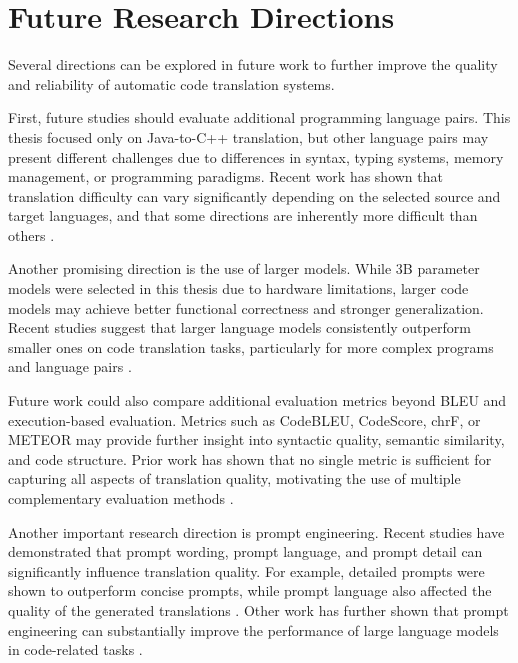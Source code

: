 \chapter{Future Research Directions}



Several directions can be explored in future work to further improve the quality
and reliability of automatic code translation systems.

First, future studies should evaluate additional programming language pairs.
This thesis focused only on Java-to-C++ translation, but other language pairs
may present different challenges due to differences in syntax, typing systems,
memory management, or programming paradigms. Recent work has shown that
translation difficulty can vary significantly depending on the selected source
and target languages, and that some directions are inherently more difficult
than others \cite{aljagthami2025prompt}.

Another promising direction is the use of larger models. While 3B parameter
models were selected in this thesis due to hardware limitations, larger code
models may achieve better functional correctness and stronger generalization.
Recent studies suggest that larger language models consistently outperform
smaller ones on code translation tasks, particularly for more complex programs
and language pairs \cite{yang2024llm, aljagthami2025prompt}.

Future work could also compare additional evaluation metrics beyond BLEU and
execution-based evaluation. Metrics such as CodeBLEU, CodeScore, chrF, or
METEOR may provide further insight into syntactic quality, semantic similarity,
and code structure. Prior work has shown that no single metric is sufficient
for capturing all aspects of translation quality, motivating the use of
multiple complementary evaluation methods \cite{evtikhiev2022bleu,
codescore2023}.

Another important research direction is prompt engineering. Recent studies have
demonstrated that prompt wording, prompt language, and prompt detail can
significantly influence translation quality. For example, detailed prompts were
shown to outperform concise prompts, while prompt language also affected the
quality of the generated translations \cite{aljagthami2025prompt}. Other work
has further shown that prompt engineering can substantially improve the
performance of large language models in code-related tasks \cite{chen2025prompt}.

